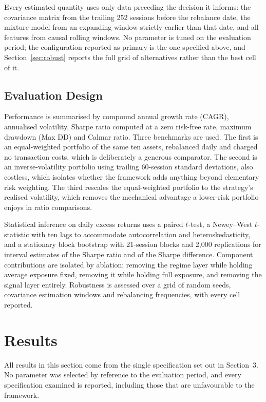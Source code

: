 \documentclass{singlecol-new}
\theoremstyle{TH}{
\newtheorem{lemma}{Lemma}
\newtheorem{theorem}[lemma]{Theorem}
\newtheorem{corrolary}[lemma]{Corrolary}
\newtheorem{conjecture}[lemma]{Conjecture}
\newtheorem{proposition}[lemma]{Proposition}
\newtheorem{claim}[lemma]{Claim}
\newtheorem{stheorem}[lemma]{Wrong Theorem}
\newtheorem{algorithm}{Algorithm}
}
\theoremstyle{THrm}{
\newtheorem{definition}{Definition}[section]
\newtheorem{question}{Question}[section]
\newtheorem{remark}{Remark}
\newtheorem{scheme}{Scheme}
}
\theoremstyle{THhit}{
\newtheorem{case}{Case}[section]
}
\begin{document}
Every estimated quantity uses only data preceding the decision it informs: the
covariance matrix from the trailing 252 sessions before the rebalance date, the mixture
model from an expanding window strictly earlier than that date, and all features from
causal rolling windows. No parameter is tuned on the evaluation period; the
configuration reported as primary is the one specified above, and
Section~\ref{sec:robust} reports the full grid of alternatives rather than the best
cell of it.

\subsection{Evaluation Design}

Performance is summarised by compound annual growth rate (CAGR), annualised
volatility, Sharpe ratio computed at a zero risk-free rate, maximum drawdown (Max DD)
and Calmar ratio. Three
benchmarks are used. The first is an equal-weighted portfolio of the same ten assets,
rebalanced daily and charged no transaction costs, which is deliberately a generous
comparator. The second is an inverse-volatility portfolio using trailing 60-session
standard deviations, also costless, which isolates whether the framework adds anything
beyond elementary risk weighting. The third rescales the equal-weighted portfolio to
the strategy's realised volatility, which removes the mechanical advantage a
lower-risk portfolio enjoys in ratio comparisons.

Statistical inference on daily excess returns uses a paired $t$-test, a Newey--West
$t$-statistic with ten lags to accommodate autocorrelation and heteroskedasticity, and
a stationary block bootstrap with 21-session blocks and 2{,}000 replications for
interval estimates of the Sharpe ratio and of the Sharpe difference. Component
contributions are isolated by ablation: removing the regime layer while holding average
exposure fixed, removing it while holding full exposure, and removing the signal layer
entirely. Robustness is assessed over a grid of random seeds, covariance estimation
windows and rebalancing frequencies, with every cell reported.

\section{Results}
\label{sec:results}

All results in this section come from the single specification set out in Section~3.
No parameter was selected by reference to the evaluation period, and every
specification examined is reported, including those that are unfavourable to the
framework.
\end{document}

